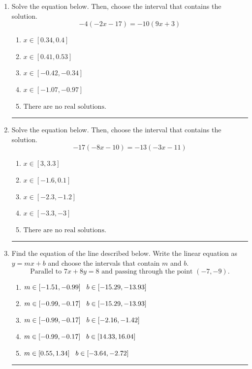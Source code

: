 \documentclass[14pt]{extbook}
\newcommand{\litem}[1]{\item#1\hspace*{-1cm}\rule{\textwidth}{0.4pt}}
\begin{document}
\begin{enumerate}
{\begin{enumerate}[label=\Alph*.]
\end{enumerate} }
\litem{
Solve the equation below. Then, choose the interval that contains the solution.\[ -4(-2x -17) = -10(9x + 3) \]\begin{enumerate}[label=\Alph*.]
\item \( x \in [0.34, 0.4] \)
\item \( x \in [0.41, 0.53] \)
\item \( x \in [-0.42, -0.34] \)
\item \( x \in [-1.07, -0.97] \)
\item \( \text{There are no real solutions.} \)

\end{enumerate} }
\litem{
Solve the equation below. Then, choose the interval that contains the solution.\[ -17(-8x -10) = -13(-3x -11) \]\begin{enumerate}[label=\Alph*.]
\item \( x \in [3, 3.3] \)
\item \( x \in [-1.6, 0.1] \)
\item \( x \in [-2.3, -1.2] \)
\item \( x \in [-3.3, -3] \)
\item \( \text{There are no real solutions.} \)

\end{enumerate} }
\litem{
Find the equation of the line described below. Write the linear equation as $ y=mx+b $ and choose the intervals that contain $m$ and $b$.\[ \text{Parallel to } 7 x + 8 y = 8 \text{ and passing through the point } (-7, -9). \]\begin{enumerate}[label=\Alph*.]
\item \( m \in [-1.51, -0.99] \hspace*{3mm} b \in [-15.29, -13.93] \)
\item \( m \in [-0.99, -0.17] \hspace*{3mm} b \in [-15.29, -13.93] \)
\item \( m \in [-0.99, -0.17] \hspace*{3mm} b \in [-2.16, -1.42] \)
\item \( m \in [-0.99, -0.17] \hspace*{3mm} b \in [14.33, 16.04] \)
\item \( m \in [0.55, 1.34] \hspace*{3mm} b \in [-3.64, -2.72] \)


\end{enumerate}}
\end{enumerate}
\end{document}
